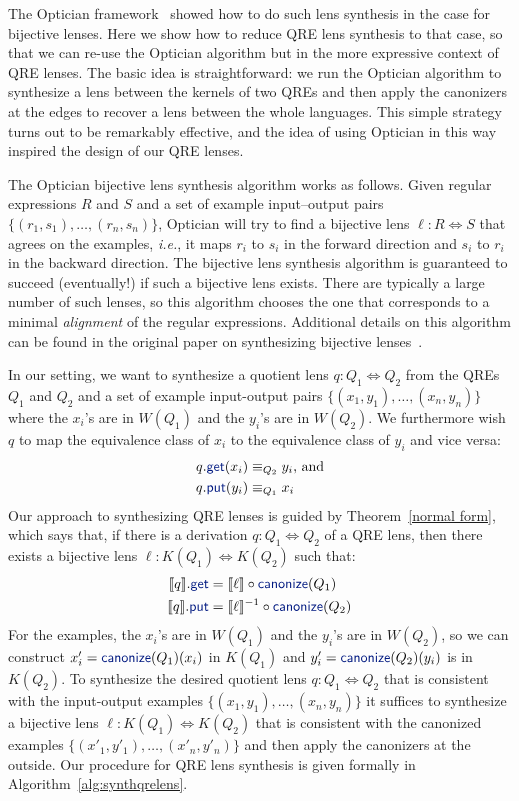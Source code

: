 \documentclass[acmsmall,review,anonymous]{acmart}
\newcommand{\kw}[1]{\textcolor{dkblue}{\ensuremath{\mathsf{#1}}}}
\newcommand{\canonize}{\ensuremath{\kw{canonize}}}
\newcommand{\get}{\ensuremath{\kw{get}}}
\newcommand{\lput}{\ensuremath{\kw{put}}}
\begin{document}
The Optician framework~\cite{optician} showed how to do such lens synthesis in
the case for bijective lenses. Here we show how to reduce QRE lens synthesis to
that case, so that we can re-use the Optician algorithm but in the more
expressive context of QRE lenses.  The basic idea is straightforward: we run the
Optician algorithm to synthesize a lens between the kernels of two QREs and then
apply the canonizers at the edges to recover a lens between the whole
languages.  This simple strategy turns out to be remarkably effective, and the
idea of using Optician in this way inspired the design of our QRE lenses.  

The Optician bijective lens synthesis algorithm works as follows. Given regular
expressions $R$ and $S$ and a set of example input--output pairs $\{(r_1,
s_1),\allowbreak \ldots,\allowbreak (r_n, s_n)\}$, Optician will try to find a
bijective lens $\ell : R \Leftrightarrow S$ that agrees on the examples,
\textit{i.e.}, it maps $r_i$ to $s_i$ in the forward direction and $s_i$ to
$r_i$ in the backward direction. The bijective lens synthesis algorithm is
guaranteed to succeed (eventually!) if such a bijective lens exists. There are
typically a large number of such lenses, so this algorithm chooses the one that
corresponds to a minimal \emph{alignment} of the regular expressions. Additional
details on this algorithm can be found in the original paper on synthesizing
bijective lenses~\cite{optician}.

In our setting, we want to synthesize a quotient lens $q: Q_1 \Leftrightarrow
Q_2$ from the QREs $Q_1$ and $Q_2$ and a set of example input-output pairs
$\{(x_1, y_1),\allowbreak \ldots,\allowbreak (x_n, y_n)\}$ where the $x_i$'s are
in $W(Q_1)$ and the $y_i$'s are in $W(Q_2)$. We furthermore wish $q$ to map the
equivalence class of $x_i$ to the equivalence class of $y_i$ and vice versa:
\begin{align*}
q.\get(x_i) &\equiv_{Q_2} y_i \text{, and}\\
q.\lput(y_i) &\equiv_{Q_1} x_i
\end{align*}
Our approach to synthesizing QRE lenses is guided by Theorem~\ref{normal form},
which says that, if there is a derivation $q : Q_1 \Leftrightarrow Q_2$ of a
QRE lens, then there exists a bijective lens $\ell : K(Q_1) \Leftrightarrow
K(Q_2)$ such that:
\begin{align*}
\llbracket q \rrbracket.\get &= \llbracket \ell \rrbracket\circ \canonize(Q_1)\\
\llbracket q \rrbracket.\lput &= \llbracket \ell \rrbracket^{-1} \circ
\canonize(Q_2)
\end{align*}
For the examples, the $x_i$'s are in $W(Q_1)$ and the $y_i$'s are 
in $W(Q_2)$, so we can construct ${x'_i} = \canonize(Q_1)(x_i)$ in $K(Q_1)$
and ${y'_i} = \canonize(Q_2)(y_i)$ is in $K(Q_2)$. To synthesize the desired
quotient lens $q: Q_1 \Leftrightarrow Q_2$ that is consistent with the
input-output examples $\{(x_1, y_1), \ldots, (x_n, y_n)\}$ it suffices to
synthesize a bijective lens $\ell : K(Q_1) \Leftrightarrow K(Q_2)$ that is
consistent with the canonized examples $\{({x'_1}, {y'_1}), \ldots, ({x'_n},
{y'_n})\}$ and then apply the canonizers at the outside. Our procedure for QRE
lens synthesis is given formally in Algorithm~\ref{alg:synthqrelens}.
\end{document}
